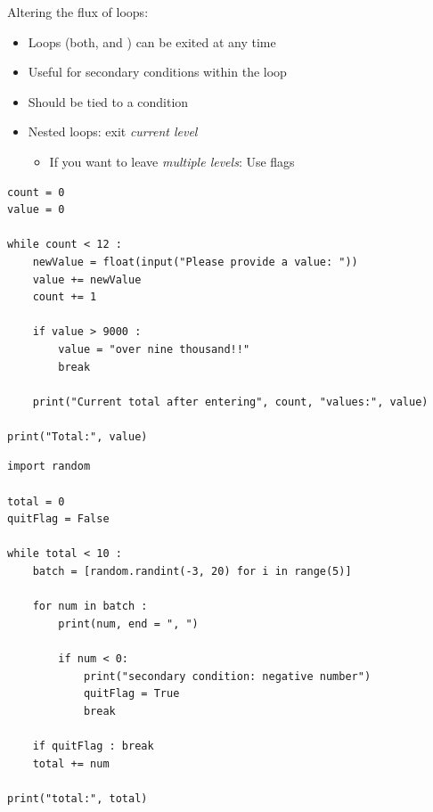 \begin{frame}[fragile]{Altering the flux of loops: }
%
\begin{itemize}
\item Loops (\ie both,  and ) can be exited at any time
\item Useful for secondary conditions within the loop
\item Should be tied to a condition\\
 \Thus {}
\item Nested loops: exit \emph{current level}
	\begin{itemize}
	\item If you want to leave \emph{multiple levels}: Use flags
	\end{itemize}
\end{itemize}
%
\end{frame}


\begin{frame}[fragile]
\begin{codebox}
\begin{verbatim}
count = 0
value = 0

while count < 12 :
    newValue = float(input("Please provide a value: "))
    value += newValue
    count += 1
  
    if value > 9000 :
        value = "over nine thousand!!"
        break
  
    print("Current total after entering", count, "values:", value)

print("Total:", value)
\end{verbatim}
\end{codebox}
\end{frame}


\begin{frame}[fragile]
%
\vspace{-6pt}
\begin{codebox}
\begin{verbatim}
import random

total = 0
quitFlag = False

while total < 10 :
    batch = [random.randint(-3, 20) for i in range(5)]
    
    for num in batch :
        print(num, end = ", ")

        if num < 0:
            print("secondary condition: negative number")
            quitFlag = True
            break
            
    if quitFlag : break
    total += num
    
print("total:", total)
\end{verbatim}
\end{codebox}
\end{frame}

